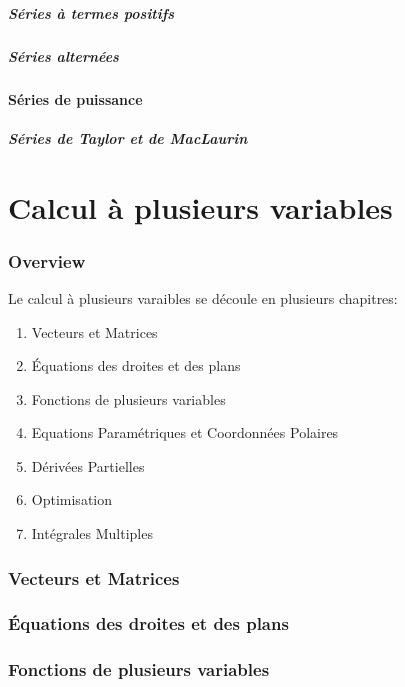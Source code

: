\documentclass{article}
\begin{document}
\subsubsection{Séries à termes positifs}
\subsubsection{Séries alternées}
\subsection{Séries de puissance}
\subsubsection{Séries de Taylor et de MacLaurin}

\pagebreak

\part{Calcul à plusieurs variables}
\section{Overview}

Le calcul à plusieurs varaibles se découle en plusieurs chapitres:

\begin{enumerate}
    \item Vecteurs et Matrices
    \item Équations des droites et des plans
    \item Fonctions de plusieurs variables
    \item Equations Paramétriques et Coordonnées Polaires
    \item Dérivées Partielles
    \item Optimisation
    \item Intégrales Multiples
\end{enumerate}
\pagebreak

\section{Vecteurs et Matrices}
\section{Équations des droites et des plans}
\section{Fonctions de plusieurs variables}
\end{document}
